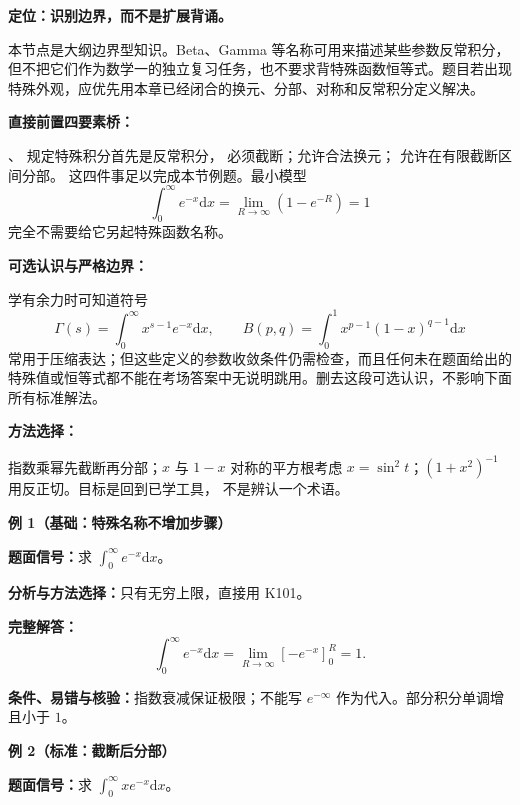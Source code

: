 
\par

\begin{knowledgeBox}
\textbf{定位：识别边界，而不是扩展背诵。}

本节点是大纲边界型知识。Beta、Gamma 等名称可用来描述某些参数反常积分，
但不把它们作为数学一的独立复习任务，也不要求背特殊函数恒等式。题目若出现
特殊外观，应优先用本章已经闭合的换元、分部、对称和反常积分定义解决。

\textbf{直接前置四要素桥：}

、
规定特殊积分首先是反常积分，
必须截断；允许合法换元；
允许在有限截断区间分部。
这四件事足以完成本节例题。最小模型
\[
\int_0^\infty e^{-x}\mathrm dx
=\lim_{R\to\infty}(1-e^{-R})=1
\]
完全不需要给它另起特殊函数名称。

\textbf{可选认识与严格边界：}

学有余力时可知道符号
\[
\Gamma(s)=\int_0^\infty x^{s-1}e^{-x}\mathrm dx,\qquad
B(p,q)=\int_0^1x^{p-1}(1-x)^{q-1}\mathrm dx
\]
常用于压缩表达；但这些定义的参数收敛条件仍需检查，而且任何未在题面给出的
特殊值或恒等式都不能在考场答案中无说明跳用。删去这段可选认识，不影响下面
所有标准解法。

\textbf{方法选择：}

指数乘幂先截断再分部；\(x\) 与 \(1-x\) 对称的平方根考虑
\(x=\sin^2t\)；\((1+x^2)^{-1}\) 用反正切。目标是回到已学工具，
不是辨认一个术语。

\textbf{例 1（基础：特殊名称不增加步骤）}

\textbf{题面信号：}求 \(\int_0^\infty e^{-x}\mathrm dx\)。

\textbf{分析与方法选择：}只有无穷上限，直接用 K101。

\textbf{完整解答：}
\[
\int_0^\infty e^{-x}\mathrm dx
=\lim_{R\to\infty}[-e^{-x}]_0^R=1.
\]

\textbf{条件、易错与核验：}指数衰减保证极限；不能写
\(e^{-\infty}\) 作为代入。部分积分单调增且小于 \(1\)。

\textbf{例 2（标准：截断后分部）}

\textbf{题面信号：}求
\(\int_0^\infty xe^{-x}\mathrm dx\)。


\end{knowledgeBox}
